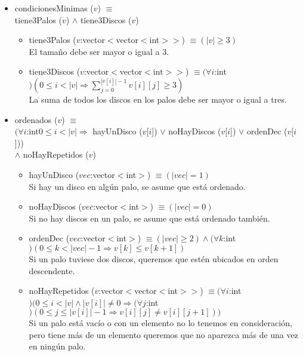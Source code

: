 \documentclass[10 pt]{article}
\begin{document}
            \begin{itemize}
                \item condicionesMinimas ($v$) $\equiv$ 
                \\
                tiene3Palos ($v$) $\wedge$ tiene3Discos ($v$)
                \begin{itemize}
                    \item tiene3Palos ($v$:vector$<$vector$<$int$>>$) $\equiv (|v| \geq 3)$
                    \\
                    El tamaño debe ser mayor o igual a 3.
                    \item tiene3Discos ($v$:vector$<$vector$<$int$>>$) $\equiv (\forall i$:int$)(0 \leq i < |v| \Rightarrow \sum^{|v[i]|-1}_{j=0}v[i][j] \geq 3)$
                    \\
                    La suma de todos los discos en los palos debe ser mayor o igual a tres.
                \end{itemize}
                \item ordenados ($v$) $\equiv$
                \\
                $(\forall i$:int$0 \leq i < |v| \Rightarrow$ hayUnDisco ($v$[$i$]) $\vee$ noHayDiscos ($v$[$i$]) $\vee$ ordenDec ($v$[$i$]))
                \\
                $\wedge$ noHayRepetidos ($v$)
                \begin{itemize}
                    \item hayUnDisco ($vec$:vector$<$int$>$) $\equiv (|vec| = 1)$
                    \\
                    Si hay un disco en algún palo, se asume que está ordenado.
                    \item noHayDiscos  ($vec$:vector$<$int$>$) $\equiv (|vec| = 0)$
                    \\
                    Si no hay discos en un palo, se asume que está ordenado también.
                    \item ordenDec ($vec$:vector$<$int$>$) $\equiv (|vec| \geq 2) \wedge (\forall k$:int$)(0 \leq k < |vec|-1 \Rightarrow v[k] \leq v[k+1])$
                    \\
                    Si un palo tuviese dos discos, queremos que estén ubicados en orden descendente.
                    \item noHayRepetidos ($v$:vector$<$vector$<$int$>>$) $\equiv (\forall i$:int$)(0 \leq i < |v| \wedge |v[i]| \neq 0 \Rightarrow (\forall j$:int$)(0 \leq j \leq |v[i]|-1 \Rightarrow v[i][j] \neq v[i][j+1]))$
                    \\
                    Si un palo está vacío o con un elemento no lo tenemos en consideración, pero tiene más de un elemento queremos que no aparezca más de una vez en ningún palo.
                \end{itemize}
            \end{itemize}
    
\end{document}
